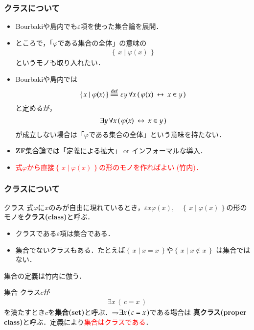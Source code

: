 \documentclass[dvipdfmx,10pt,notheorems]{beamer}
\theoremstyle{definition}
\newcommand{\Set}[2]{\left\{\, #1 \mid #2\, \right\}} %
\newcommand{\defeq}{\overset{\mathrm{def}}{=\joinrel=}} %
\newcommand{\negation}{\rightharpoondown\hspace{-0.25em}} %
\newcommand{\lrarrow}{\hspace{0.25em}\leftrightarrow\hspace{0.25em}} %
\begin{document}
\begin{frame}\frametitle{クラスについて}
	\begin{itemize}
		\item Bourbaki\cite{Bourbaki}や島内\cite{Shimauchi}でも$\varepsilon$項を使った集合論を展開．
		
		\item ところで，「$\varphi$である集合の全体」の意味の
			\begin{align}
				\Set{x}{\varphi(x)}
			\end{align}
			というモノも取り入れたい．
		
		\item Bourbaki\cite{Bourbaki}や島内\cite{Shimauchi}では
			\begin{align}
				\Set{x}{\varphi(x)} \defeq \varepsilon y\, \forall x\, 
				(\, \varphi(x) \lrarrow x \in y\, )
			\end{align}
			と定めるが，
			\begin{align}
				\exists y\, \forall x\, (\, \varphi(x) \lrarrow x \in y\, )
			\end{align}
			が成立しない場合は「$\varphi$である集合の全体」という意味を持たない．
		
		\item {\bf ZF}集合論では「定義による拡大」 or インフォーマルな導入．
			
		\item \textcolor{red}{式$\varphi$から直接$\Set{x}{\varphi(x)}$の形のモノを作ればよい
			(竹内\cite{TakeuchiSet})．}
	\end{itemize}
\end{frame}

\begin{frame}\frametitle{クラスについて}
	\begin{exampleblock}{クラス}
		式$\varphi$に$x$のみが自由に現れているとき，$\varepsilon x \varphi(x),
		\quad \Set{x}{\varphi(x)}$の形のモノを{\bf クラス(class)}と呼ぶ．
	\end{exampleblock}
	
	\begin{itemize}
		\item クラスである$\varepsilon$項は集合である．
		\item 集合でないクラスもある．たとえば$\Set{x}{x = x}$や$\Set{x}{x \notin x}$
			は集合ではない．
	\end{itemize}
	
	集合の定義は竹内\cite{TakeuchiSet}に倣う．
	\begin{exampleblock}{集合}
		クラス$c$が
		\begin{align}
			\exists x\, (\, c = x\, )
		\end{align}
		を満たすとき$c$を{\bf 集合(set)}と呼ぶ．$\negation \exists x\, (\, c = x\, )$である場合は
		{\bf 真クラス(proper class)}と呼ぶ．定義により\textcolor{red}{集合はクラスである}．
	\end{exampleblock}
\end{frame}
\end{document}
